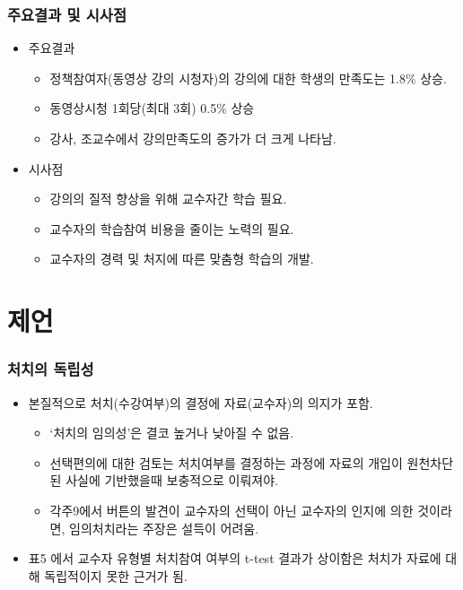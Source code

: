 \documentclass[aspectratio=169,xcolor=dvipsnames,handout]{beamer}
\begin{document}
\begin{frame}
    \frametitle{주요결과 및 시사점}
    \begin{itemize}[<+->]
        \item 주요결과
            \begin{itemize}[<+->]
                \item 정책참여자(동영상 강의 시청자)의 강의에 대한 학생의 만족도는 1.8\% 상승.
                \item 동영상시청 1회당(최대 3회) 0.5\% 상승
                \item 강사, 조교수에서 강의만족도의 증가가 더 크게 나타남.
            \end{itemize}
        \item 시사점
            \begin{itemize}[<+->]
                \item 강의의 질적 향상을 위해 교수자간 학습 필요.
                \item 교수자의 학습참여 비용을 줄이는 노력의 필요.
                \item 교수자의 경력 및 처지에 따른 맞춤형 학습의 개발.
            \end{itemize}
    \end{itemize}
\end{frame}

\section{제언}%

\begin{frame}
    \frametitle{처치의 독립성}
    \begin{itemize}[<+->]
        \item 본질적으로 처치(수강여부)의 결정에 자료(교수자)의 의지가 포함.
        \begin{itemize}[<+->]
            \item `처치의 임의성'은 결코 높거나 낮아질 수 없음.
            \item 선택편의에 대한 검토는 처치여부를 결정하는 과정에 자료의 개입이 원천차단 된 사실에 기반했을때 보충적으로 이뤄져야.
            \item 각주9에서 버튼의 발견이 교수자의 선택이 아닌 교수자의 인지에 의한 것이라면, 임의처치라는 주장은 설득이 어려움.
        \end{itemize}
        \item 표5 에서 교수자 유형별 처치참여 여부의 t-test 결과가 상이함은 처치가 자료에 대해 독립적이지 못한 근거가 됨.
    \end{itemize}
\end{frame}
\end{document}
